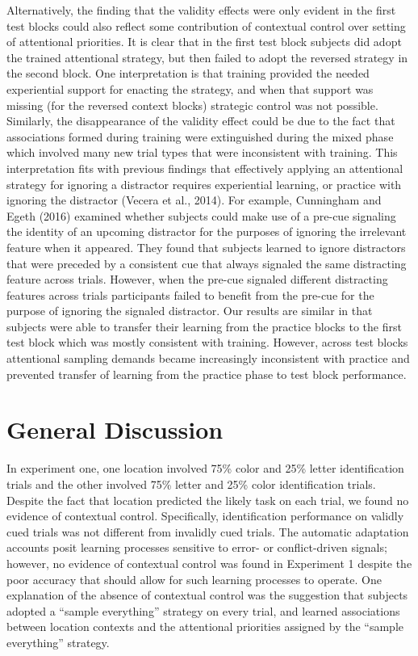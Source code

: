 \documentclass[]{DissertateCUNY}
\begin{document}
Alternatively, the finding that the validity effects were only evident
in the first test blocks could also reflect some contribution of
contextual control over setting of attentional priorities. It is clear
that in the first test block subjects did adopt the trained attentional
strategy, but then failed to adopt the reversed strategy in the second
block. One interpretation is that training provided the needed
experiential support for enacting the strategy, and when that support
was missing (for the reversed context blocks) strategic control was not
possible. Similarly, the disappearance of the validity effect could be
due to the fact that associations formed during training were
extinguished during the mixed phase which involved many new trial types
that were inconsistent with training. This interpretation fits with
previous findings that effectively applying an attentional strategy for
ignoring a distractor requires experiential learning, or practice with
ignoring the distractor (Vecera et al., 2014). For example, Cunningham
and Egeth (2016) examined whether subjects could make use of a pre-cue
signaling the identity of an upcoming distractor for the purposes of
ignoring the irrelevant feature when it appeared. They found that
subjects learned to ignore distractors that were preceded by a
consistent cue that always signaled the same distracting feature across
trials. However, when the pre-cue signaled different distracting
features across trials participants failed to benefit from the pre-cue
for the purpose of ignoring the signaled distractor. Our results are
similar in that subjects were able to transfer their learning from the
practice blocks to the first test block which was mostly consistent with
training. However, across test blocks attentional sampling demands
became increasingly inconsistent with practice and prevented transfer of
learning from the practice phase to test block performance.

\hypertarget{general-discussion}{%
\section{General Discussion}\label{general-discussion}}

In experiment one, one location involved 75\% color and 25\% letter
identification trials and the other involved 75\% letter and 25\% color
identification trials. Despite the fact that location predicted the
likely task on each trial, we found no evidence of contextual control.
Specifically, identification performance on validly cued trials was not
different from invalidly cued trials. The automatic adaptation accounts
posit learning processes sensitive to error- or conflict-driven signals;
however, no evidence of contextual control was found in Experiment 1
despite the poor accuracy that should allow for such learning processes
to operate. One explanation of the absence of contextual control was the
suggestion that subjects adopted a ``sample everything'' strategy on
every trial, and learned associations between location contexts and the
attentional priorities assigned by the ``sample everything'' strategy.
\end{document}
